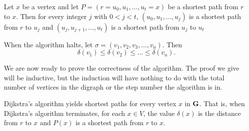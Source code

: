 \begin{proposition}
Let $x$ be a vertex and let $P=(r=u_0,u_1,\dots,u_t=x)$ be
a shortest path from $r$ to $x$.  Then for every
integer $j$ with $0<j<t$,
$(u_0,u_1,\dots,u_j)$ is a shortest path from $r$
to $u_j$ and $(u_j,u_{j+1},\dots,u_t)$ is a shortest
path from $u_j$ to $u_t$
\end{proposition}

\begin{proposition}
When the algorithm halts, let $\sigma=(v_1,v_2,v_3,\dots,v_n)$. 
Then \[\delta(v_1)\le \delta(v_2)\le\dots \le \delta(v_n). \]
\end{proposition}

We are now ready to prove the correctness of the algorithm. The proof
we give will be inductive, but the induction will have nothing to do
with the total number of vertices in the digraph or the step number
the algorithm is in.

\begin{theorem}
  Dijkstra's algorithm yields shortest paths for every vertex $x$ in
  $\mathbf{G}$. That is, when Dijkstra's algorithm terminates, for each
  $x\in V$, the value $\delta(x)$ is the distance from $r$ to $x$ and
  $P(x)$ is a shortest path from $r$ to $x$.
\end{theorem}

